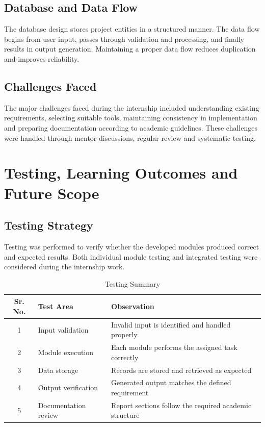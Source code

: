 \documentclass[12pt,a4paper]{report}
\newcommand{\chapterheader}{CHAPTER HEADING}
\begin{document}
\section{Database and Data Flow}
The database design stores project entities in a structured manner. The data flow begins from user input, passes through validation and processing, and finally results in output generation. Maintaining a proper data flow reduces duplication and improves reliability.

\section{Challenges Faced}
The major challenges faced during the internship included understanding existing requirements, selecting suitable tools, maintaining consistency in implementation and preparing documentation according to academic guidelines. These challenges were handled through mentor discussions, regular review and systematic testing.
\clearpage

\renewcommand{\chapterheader}{CHAPTER 4}
\chapter{Testing, Learning Outcomes and Future Scope}
\section{Testing Strategy}
Testing was performed to verify whether the developed modules produced correct and expected results. Both individual module testing and integrated testing were considered during the internship work.

\begin{table}[h!]
\centering
\caption{Testing Summary}
\begin{tabular}{|c|p{1.7in}|p{3.0in}|}
\hline
\textbf{Sr. No.} & \textbf{Test Area} & \textbf{Observation}\\ \hline
1 & Input validation & Invalid input is identified and handled properly\\ \hline
2 & Module execution & Each module performs the assigned task correctly\\ \hline
3 & Data storage & Records are stored and retrieved as expected\\ \hline
4 & Output verification & Generated output matches the defined requirement\\ \hline
5 & Documentation review & Report sections follow the required academic structure\\ \hline
\end{tabular}
\end{table}
\end{document}
